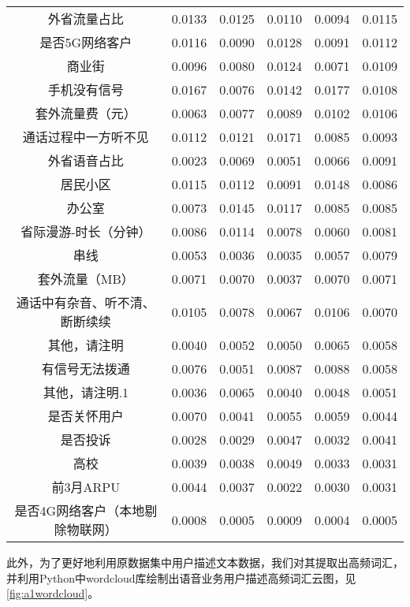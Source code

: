 \documentclass{MathorCupmodeling}
\begin{document}
\begin{table}[htbp]
{\begin{tabular}{c|cccc|c}
	  外省流量占比 & 0.0133  & 0.0125  & 0.0110  & 0.0094  & 0.0115  \\
	  是否5G网络客户 & 0.0116  & 0.0090  & 0.0128  & 0.0091  & 0.0112  \\
	  商业街   & 0.0096  & 0.0080  & 0.0124  & 0.0071  & 0.0109  \\
	  手机没有信号 & 0.0167  & 0.0076  & 0.0142  & 0.0177  & 0.0108  \\
	  套外流量费（元） & 0.0063  & 0.0077  & 0.0089  & 0.0102  & 0.0106  \\
	  通话过程中一方听不见 & 0.0112  & 0.0121  & 0.0171  & 0.0085  & 0.0093  \\
	  外省语音占比 & 0.0023  & 0.0069  & 0.0051  & 0.0066  & 0.0091  \\
	  居民小区  & 0.0115  & 0.0112  & 0.0091  & 0.0148  & 0.0086  \\
	  办公室   & 0.0073  & 0.0145  & 0.0117  & 0.0085  & 0.0085  \\
	  省际漫游-时长（分钟） & 0.0086  & 0.0114  & 0.0078  & 0.0060  & 0.0081  \\
	  串线    & 0.0053  & 0.0036  & 0.0035  & 0.0057  & 0.0079  \\
	  套外流量（MB） & 0.0071  & 0.0070  & 0.0037  & 0.0070  & 0.0071  \\
	  通话中有杂音、听不清、断断续续 & 0.0105  & 0.0078  & 0.0067  & 0.0106  & 0.0070  \\
	  其他，请注明 & 0.0040  & 0.0052  & 0.0050  & 0.0065  & 0.0058  \\
	  有信号无法拨通 & 0.0076  & 0.0051  & 0.0087  & 0.0088  & 0.0058  \\
	  其他，请注明.1 & 0.0036  & 0.0065  & 0.0040  & 0.0048  & 0.0051  \\
	  是否关怀用户 & 0.0070  & 0.0041  & 0.0055  & 0.0059  & 0.0044  \\
	  是否投诉  & 0.0028  & 0.0029  & 0.0047  & 0.0032  & 0.0041  \\
	  高校    & 0.0039  & 0.0038  & 0.0049  & 0.0033  & 0.0031  \\
	  前3月ARPU & 0.0044  & 0.0037  & 0.0022  & 0.0030  & 0.0031  \\
	  是否4G网络客户（本地剔除物联网） & 0.0008  & 0.0005  & 0.0009  & 0.0004  & 0.0005  \\
	  \bottomrule
	  \end{tabular}}
	\label{tab:a1allquantization}
  	\end{table}

	此外，为了更好地利用原数据集中用户描述文本数据，我们对其提取出高频词汇，并利用Python中wordcloud库绘制出语音业务用户描述高频词汇云图，见\textcolor{blue}{\cref{fig:a1wordcloud}}。
\end{document}
